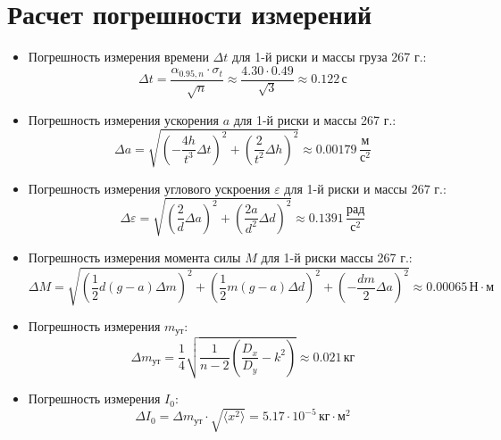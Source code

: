 \newpage
\section{Расчет погрешности измерений}
\begin{itemize}
    \item Погрешность измерения времени $\Delta t$ для 1-й риски и массы груза 267 г.:
    \[ \Delta t = \frac{\alpha_{0.95, n} \cdot \sigma_t}{\sqrt{n}} \approx \frac{4.30 \cdot 0.49}{\sqrt{3}} \approx 0.122 \, \text{с} \]
    \item Погрешность измерения ускорения $a$ для 1-й риски и массы 267 г.:
    \[
        \Delta a =
        \sqrt{\left(-\frac{4h}{t^3} \Delta t \right)^2 + \left(\frac{2}{t^2} \Delta h\right)^2}
        \approx 0.00179 \, \frac{\text{м}}{\text{с}^2}
    \]
    \item Погрешность измерения углового ускроения $\varepsilon$ для 1-й риски и массы $267$ г.:
    \[
        \Delta \varepsilon = 
        \sqrt{\left(\frac{2}{d} \Delta a \right)^2 + \left( \frac{2a}{d^2} \Delta d \right)^2}
        \approx 0.1391 \, \frac{\text{рад}}{\text{с}^2}
    \]
    \item Погрешность измерения момента силы $M$ для 1-й риски массы 267 г.:
    \[
        \Delta M =
        \sqrt{\left(\frac{1}{2}d(g-a) \Delta m\right)^2 + \left(\frac{1}{2}m(g-a) \Delta d \right)^2 + \left(- \frac{dm}{2} \Delta a\right)^2}
        \approx 0.00065 \, \text{Н} \cdot \text{м}
    \]


    \item Погрешность измерения $m_\text{ут}$:
        \[
            \Delta m_\text{ут} = 
            \frac{1}{4} \sqrt{\frac{1}{n-2} \left(\frac{D_x}{D_y} - k^2\right) }
            \approx 0.021 \, \text{кг}
        \]

    \item Погрешность измерения $I_0$:
        \[
            \Delta I_0 =
            \Delta m_\text{ут} \cdot \sqrt{\langle x^2 \rangle} =
            5.17 \cdot 10^{-5} \, \text{кг} \cdot \text{м}^2
        \]
\end{itemize}
